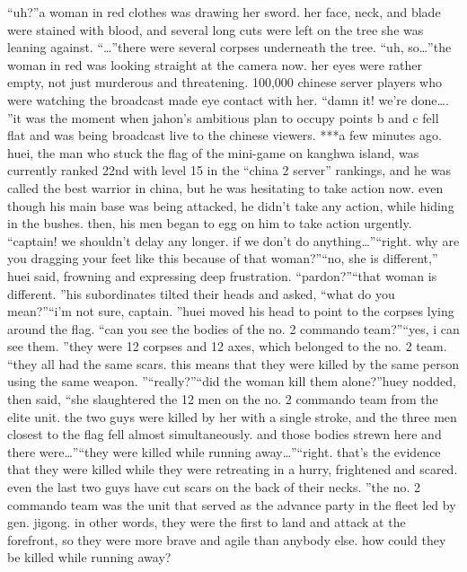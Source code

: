 “uh?”a woman in red clothes was drawing her sword.
 her face, neck, and blade were stained with blood, and several long cuts were left on the tree she was leaning against.
“…”there were several corpses underneath the tree.
“uh, so…”the woman in red was looking straight at the camera now.
 her eyes were rather empty, not just murderous and threatening.
100,000 chinese server players who were watching the broadcast made eye contact with her.
“damn it! we’re done….
”it was the moment when jahon’s ambitious plan to occupy points b and c fell flat and was being broadcast live to the chinese viewers.
***a few minutes ago.
huei, the man who stuck the flag of the mini-game on kanghwa island, was currently ranked 22nd with level 15 in the “china 2 server” rankings, and he was called the best warrior in china, but he was hesitating to take action now.
even though his main base was being attacked, he didn’t take any action, while hiding in the bushes.
 then, his men began to egg on him to take action urgently.
“captain! we shouldn’t delay any longer.
 if we don’t do anything…”“right.
 why are you dragging your feet like this because of that woman?”“no, she is different,” huei said, frowning and expressing deep frustration.
“pardon?”“that woman is different.
”his subordinates tilted their heads and asked, “what do you mean?”“i’m not sure, captain.
”huei moved his head to point to the corpses lying around the flag.
“can you see the bodies of the no.
 2 commando team?”“yes, i can see them.
”they were 12 corpses and 12 axes, which belonged to the no.
 2 team.
“they all had the same scars.
 this means that they were killed by the same person using the same weapon.
”“really?”“did the woman kill them alone?”huey nodded, then said, “she slaughtered the 12 men on the no.
 2 commando team from the elite unit.
 the two guys were killed by her with a single stroke, and the three men closest to the flag fell almost simultaneously.
 and those bodies strewn here and there were…”“they were killed while running away…”“right.
 that’s the evidence that they were killed while they were retreating in a hurry, frightened and scared.
 even the last two guys have cut scars on the back of their necks.
”the no.
 2 commando team was the unit that served as the advance party in the fleet led by gen.
 jigong.
 in other words, they were the first to land and attack at the forefront, so they were more brave and agile than anybody else.
 how could they be killed while running away?

